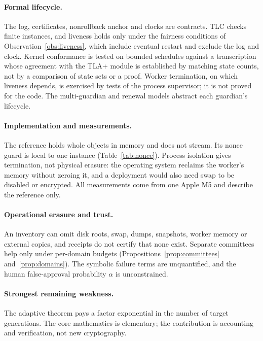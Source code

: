 \documentclass[pdflatex,sn-mathphys-num,twocolumn]{sn-jnl}
\theoremstyle{plain}
\theoremstyle{definition}
\begin{document}
\paragraph{Formal lifecycle.}
The log, certificates, nonrollback anchor and clocks are contracts. TLC checks finite instances, and liveness holds only under the fairness conditions of Observation~\ref{obs:liveness}, which include eventual restart and exclude the log and clock. Kernel conformance is tested on bounded schedules against a transcription whose agreement with the TLA+ module is established by matching state counts, not by a comparison of state sets or a proof. Worker termination, on which liveness depends, is exercised by tests of the process supervisor; it is not proved for the code. The multi-guardian and renewal models abstract each guardian's lifecycle.

\paragraph{Implementation and measurements.}
The reference holds whole objects in memory and does not stream. Its nonce guard is local to one instance (Table~\ref{tab:nonce}). Process isolation gives termination, not physical erasure: the operating system reclaims the worker's memory without zeroing it, and a deployment would also need swap to be disabled or encrypted. All measurements come from one Apple M5 and describe the reference only.

\paragraph{Operational erasure and trust.}
An inventory can omit disk roots, swap, dumps, snapshots, worker memory or external copies, and receipts do not certify that none exist. Separate committees help only under per-domain budgets (Propositions~\ref{prop:committees} and~\ref{prop:domains}). The symbolic failure terms are unquantified, and the human false-approval probability $\alpha$ is unconstrained.

\paragraph{Strongest remaining weakness.}
The adaptive theorem pays a factor exponential in the number of target generations. The core mathematics is elementary; the contribution is accounting and verification, not new cryptography.
\end{document}
